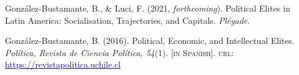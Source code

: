 





\begin{publications}

\begin{benumerate}{2}
\item{\small Gonz\'alez-Bustamante, B., \& Luci, F. (2021, {\itshape forthcoming}). Political Elites in Latin America: Socialisation, Trajectories, and Capitals. {\itshape Pl\'eyade}.}\vspace{1mm}

\item{\small Gonz\'alez-Bustamante, B. (2016). Political, Economic, and Intellectual Elites. {\itshape Pol\'itica, Revista de Ciencia Pol\'itica, 54}(1). {\footnotesize \scshape [in Spanish]}. {\scshape url}: \href{https://revistapolitica.uchile.cl/index.php/RP/issue/view/4365}{\textcolor{blue}{https://revistapolitica.uchile.cl}}} \vspace{1mm}
\end{benumerate}

\end{publications}
